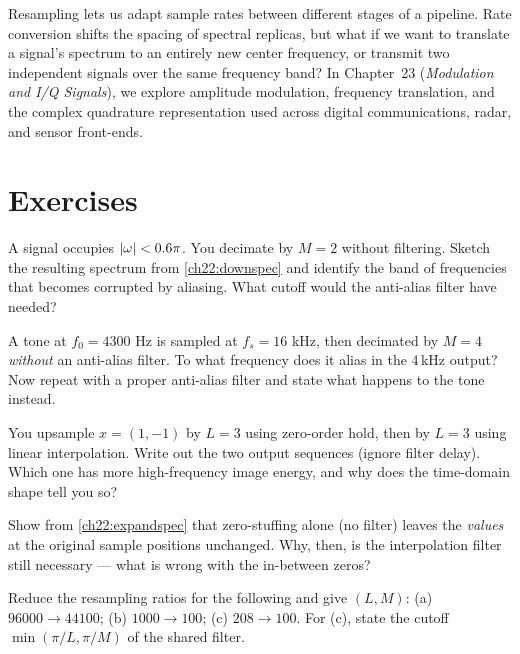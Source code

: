 Resampling lets us adapt sample rates between different stages of a pipeline.
Rate conversion shifts the spacing of spectral replicas, but what if we want to translate
a signal's spectrum to an entirely new center frequency, or transmit two independent signals
over the same frequency band? In Chapter~23 (\emph{Modulation and I/Q Signals}), we explore
amplitude modulation, frequency translation, and the complex quadrature representation
used across digital communications, radar, and sensor front-ends.

\section{Exercises}
\label{ch22:exercises}

\begin{exercise}
A signal occupies $\lvert\omega\rvert < 0.6\pi$. You decimate by $M=2$ without
filtering. Sketch the resulting spectrum from \eqref{ch22:downspec} and identify
the band of frequencies that becomes corrupted by aliasing. What cutoff would the
anti-alias filter have needed?
\end{exercise}

\begin{exercise}
A tone at $f_0 = 4300$ Hz is sampled at $f_s = 16$ kHz, then decimated by $M=4$
\emph{without} an anti-alias filter. To what frequency does it alias in the
$4$\,kHz output? Now repeat with a proper anti-alias filter and state what happens
to the tone instead.
\end{exercise}

\begin{exercise}
You upsample $x = (1, -1)$ by $L=3$ using zero-order hold, then by $L=3$ using
linear interpolation. Write out the two output sequences (ignore filter delay).
Which one has more high-frequency image energy, and why does the time-domain shape
tell you so?
\end{exercise}

\begin{exercise}
Show from \eqref{ch22:expandspec} that zero-stuffing alone (no filter) leaves the
\emph{values} at the original sample positions unchanged. Why, then, is the
interpolation filter still necessary --- what is wrong with the in-between zeros?
\end{exercise}

\begin{exercise}
Reduce the resampling ratios for the following and give $(L, M)$: (a)
$96000 \to 44100$; (b) $1000 \to 100$; (c) $208 \to 100$. For (c), state the
cutoff $\min(\pi/L, \pi/M)$ of the shared filter.
\end{exercise}

